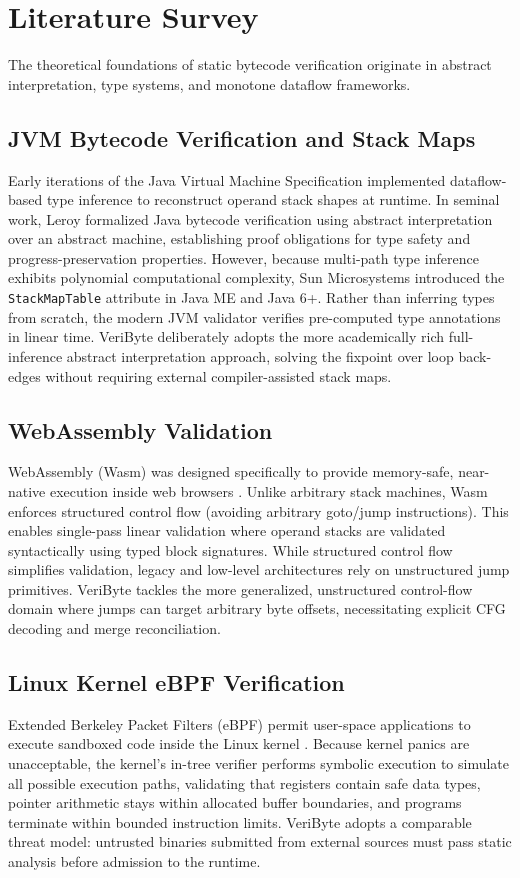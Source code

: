 \documentclass[conference]{IEEEtran}
\begin{document}
\section{Literature Survey}
The theoretical foundations of static bytecode verification originate in abstract interpretation, type systems, and monotone dataflow frameworks.

\subsection{JVM Bytecode Verification and Stack Maps}
Early iterations of the Java Virtual Machine Specification \cite{lindholm2014java} implemented dataflow-based type inference to reconstruct operand stack shapes at runtime. In seminal work, Leroy \cite{leroy2003java} formalized Java bytecode verification using abstract interpretation over an abstract machine, establishing proof obligations for type safety and progress-preservation properties. However, because multi-path type inference exhibits polynomial computational complexity, Sun Microsystems introduced the \texttt{StackMapTable} attribute in Java ME and Java 6+. Rather than inferring types from scratch, the modern JVM validator verifies pre-computed type annotations in linear time. VeriByte deliberately adopts the more academically rich full-inference abstract interpretation approach, solving the fixpoint over loop back-edges without requiring external compiler-assisted stack maps.

\subsection{WebAssembly Validation}
WebAssembly (Wasm) was designed specifically to provide memory-safe, near-native execution inside web browsers \cite{haas2017bringing}. Unlike arbitrary stack machines, Wasm enforces structured control flow (avoiding arbitrary goto/jump instructions). This enables single-pass linear validation where operand stacks are validated syntactically using typed block signatures. While structured control flow simplifies validation, legacy and low-level architectures rely on unstructured jump primitives. VeriByte tackles the more generalized, unstructured control-flow domain where jumps can target arbitrary byte offsets, necessitating explicit CFG decoding and merge reconciliation.

\subsection{Linux Kernel eBPF Verification}
Extended Berkeley Packet Filters (eBPF) permit user-space applications to execute sandboxed code inside the Linux kernel \cite{ebpf2023linux, gershuni2019simple}. Because kernel panics are unacceptable, the kernel's in-tree verifier performs symbolic execution to simulate all possible execution paths, validating that registers contain safe data types, pointer arithmetic stays within allocated buffer boundaries, and programs terminate within bounded instruction limits. VeriByte adopts a comparable threat model: untrusted binaries submitted from external sources must pass static analysis before admission to the runtime.
\end{document}
